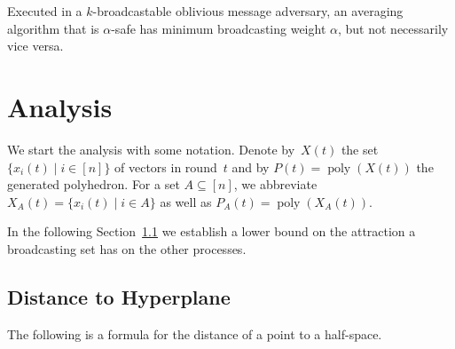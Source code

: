 \documentclass[a4paper,USenglish]{lipics-v2021}
\DeclareMathOperator\poly{poly}
\begin{document}
Executed in a $k$-broadcastable oblivious message adversary, an averaging algorithm that is $\alpha$-safe has minimum broadcasting weight $\alpha$, but not necessarily vice versa.


\section{Analysis}\label{sec:analysis}

We start the analysis with some notation.
Denote by~$X(t)$ the set
$\{ x_i(t) \mid i \in [n] \}$
of vectors in round~$t$
and
by
$P(t) = \poly(X(t))$ the generated polyhedron.
For a set $A \subseteq [n]$, we
abbreviate $X_A(t) = \{ x_i(t) \mid i \in A \}$
as well as $P_A(t) = \poly(X_A(t))$.

In the following Section~\ref{sec:distance_H} we establish a lower bound on the attraction a broadcasting set has on the other processes.


\subsection{Distance to Hyperplane}
\label{sec:distance_H}

The following is a formula for the distance of a point to a half-space.
\end{document}
